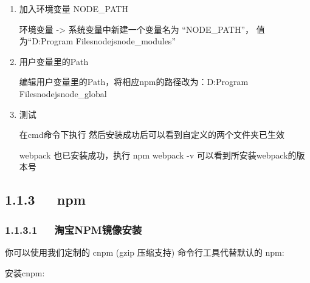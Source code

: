 \documentclass[letterpaper,12pt,english]{sphinxmanual}
\begin{document}
\begin{sphinxVerbatim}[commandchars=\\\{\}]
    
    
\end{sphinxVerbatim}
\begin{enumerate}
%
\setcounter{enumi}{1}
\item {} 
加入环境变量 NODE\_PATH

环境变量 -\textgreater{} 系统变量中新建一个变量名为 “NODE\_PATH”， 值为“D:Program Filesnodejsnode\_modules”

\item {} 
用户变量里的Path

编辑用户变量里的Path，将相应npm的路径改为：D:Program Filesnodejsnode\_global

\item {} 
测试

在cmd命令下执行  然后安装成功后可以看到自定义的两个文件夹已生效

webpack 也已安装成功，执行 npm webpack -v 可以看到所安装webpack的版本号

\end{enumerate}


\subsection{1.1.3   npm}
\label{\detokenize{001software/001install/001._u7f51_u7ad9/nodeJs:npm}}

\subsubsection{1.1.3.1   淘宝NPM镜像安装}
\label{\detokenize{001software/001install/001._u7f51_u7ad9/nodeJs:id3}}

你可以使用我们定制的 cnpm (gzip 压缩支持) 命令行工具代替默认的 npm:

安装cnpm:
\end{document}
